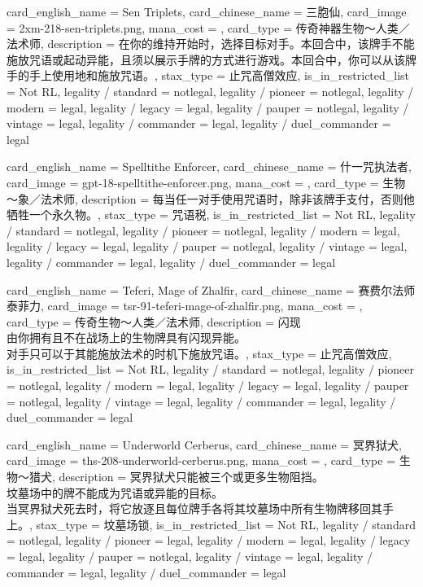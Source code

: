 \documentclass[lang = cn, color = black, 10pt]{AllThatStax}
\begin{document}
\card
{
	card_english_name = {Sen Triplets},
	card_chinese_name = {三胞仙},
	card_image = 2xm-218-sen-triplets.png,
	mana_cost = ,
	card_type = 传奇神器生物～人类／法术师,
	description = {在你的维持开始时，选择目标对手。本回合中，该牌手不能施放咒语或起动异能，且须以展示手牌的方式进行游戏。本回合中，你可以从该牌手的手上使用地和施放咒语。},
	stax_type = 止咒高僧效应,
	is_in_restricted_list = Not RL,
	legality / standard = notlegal,
	legality / pioneer = notlegal,
	legality / modern = legal,
	legality / legacy = legal,
	legality / pauper = notlegal,
	legality / vintage = legal,
	legality / commander = legal,
	legality / duel_commander = legal
}

\card
{
	card_english_name = {Spelltithe Enforcer},
	card_chinese_name = {什一咒执法者},
	card_image = gpt-18-spelltithe-enforcer.png,
	mana_cost = ,
	card_type = 生物～象／法术师,
	description = {每当任一对手使用咒语时，除非该牌手支付，否则他牺牲一个永久物。},
	stax_type = 咒语税,
	is_in_restricted_list = Not RL,
	legality / standard = notlegal,
	legality / pioneer = notlegal,
	legality / modern = legal,
	legality / legacy = legal,
	legality / pauper = notlegal,
	legality / vintage = legal,
	legality / commander = legal,
	legality / duel_commander = legal
}

\card
{
	card_english_name = {Teferi, Mage of Zhalfir},
	card_chinese_name = {赛费尔法师泰菲力},
	card_image = tsr-91-teferi-mage-of-zhalfir.png,
	mana_cost = ,
	card_type = 传奇生物～人类／法术师,
	description = {闪现\\
由你拥有且不在战场上的生物牌具有闪现异能。\\
对手只可以于其能施放法术的时机下施放咒语。},
	stax_type = 止咒高僧效应,
	is_in_restricted_list = Not RL,
	legality / standard = notlegal,
	legality / pioneer = notlegal,
	legality / modern = legal,
	legality / legacy = legal,
	legality / pauper = notlegal,
	legality / vintage = legal,
	legality / commander = legal,
	legality / duel_commander = legal
}

\card
{
	card_english_name = {Underworld Cerberus},
	card_chinese_name = {冥界狱犬},
	card_image = ths-208-underworld-cerberus.png,
	mana_cost = ,
	card_type = 生物～猎犬,
	description = {冥界狱犬只能被三个或更多生物阻挡。\\
坟墓场中的牌不能成为咒语或异能的目标。\\
当冥界狱犬死去时，将它放逐且每位牌手各将其坟墓场中所有生物牌移回其手上。},
	stax_type = 坟墓场锁,
	is_in_restricted_list = Not RL,
	legality / standard = notlegal,
	legality / pioneer = legal,
	legality / modern = legal,
	legality / legacy = legal,
	legality / pauper = notlegal,
	legality / vintage = legal,
	legality / commander = legal,
	legality / duel_commander = legal
}
\end{document}

